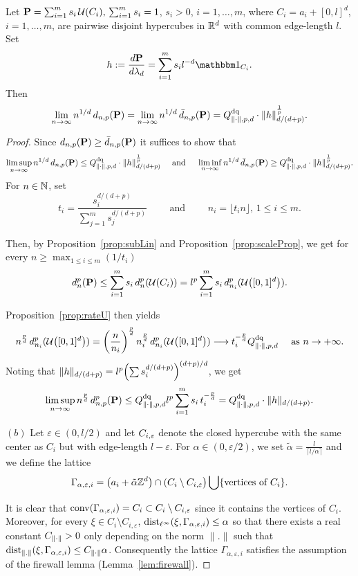 \begin{prop}\label{prop:rateCubewise}
Let $\mathbf{P} = \sum_{i=1}^m s_i\, \mathcal{U}(C_i),\, \sum_{i=1}^m s_i = 1$,  $s_i>0$, $i=1,\ldots,m$,
where $C_i=a_i+[0,l]^d$,  $i=1,\ldots,m$, are pairwise disjoint hypercubes in $\mathbb{R}^d$ with common edge-length
$l$. Set 
\[
h := \frac{d\Probb}{d\lambda_d}= \sum_{i=1}^m s_i
l^{-d}\ind{C_i}.
\]
Then
\[
 \lim_{n\to\infty} n^{1/d}\, d_{n,p}(\mathbf{P})=  \lim_{n\to\infty} n^{1/d}\, \bar d_{n,p}(\mathbf{P})= Q^{\text{dq}}_{\lVert\cdot\rVert, p, d}\cdot \lVert h\rVert_{d/(d+p)}^{\frac 1p} .
\]
\end{prop}
\begin{proof}Since $d_{n,p}(\mathbf{P})\ge \bar d_{n,p}(\mathbf{P})$ it suffices to show that 
\[
 \limsup_{n\to\infty} n^{1/d}\, d_{n,p}(\mathbf{P}) \leq Q^{\text{dq}}_{\lVert\cdot\rVert, p, d}\cdot \lVert h\rVert_{d/(d+p)}^{\frac 1p} \quad 
 \mbox{ and } \quad \liminf_{n\to\infty} n^{1/d}\, \bar d_{n,p}(\mathbf{P}) \geq Q^{\text{dq}}_{\lVert\cdot\rVert, p, d}\cdot \lVert h\rVert_{d/(d+p)}^{\frac 1p} .
\]
For $n\in\mathbb{N}$, set
\[
t_i = \frac{s_i^{d/(d+p)}}{\sum_{j=1}^m s_j^{d/(d+p)}} \qquad\text{ and }\qquad
n_i = \lfloor t_i n\rfloor, \,1\leq i \leq m.
\]

Then, by Proposition~\ref{prop:subLin} and Proposition~\ref{prop:scaleProp}, we
get for every $n\geq \max_{1\leq i \leq m}(1/t_i)$
\[
d_{n}^p(\mathbf{P}) \leq \sum_{i=1}^m s_i\, d_{n}^p(\mathcal{U}(C_i)) = l^p \sum_{i=1}^m s_i\,
d^p_{n_i}(\mathcal{U}\bigl([0,1]^d\bigr)).
\]

Proposition~\ref{prop:rateU} then yields
\[
n^{\frac pd}\, d^p_{n_i}(\mathcal{U}\bigl([0,1]^d\bigr)) = \biggl(\frac{n}{n_i}\biggr)^{\frac pd}\,
n_i^{\frac pd}\,d^p_{n_i}(\mathcal{U}\bigl([0,1]^d\bigr)) \longrightarrow  t_i^{-\frac pd} Q^{\text{dq}}_{\lVert\cdot\rVert, p, d} \quad\text{ as } n\to+\infty.
\]
Noting that  $\lVert h\rVert_{d/(d+p)} = l^p \Bigl( \sum s_i^{d/(d+p)} 
\Bigr)^{(d+p)/d}$,
we get
\[
\limsup_{n\to\infty} n^{\frac pd}\, d^p_{n,p}(\mathbf{P}) \leq Q^{\text{dq}}_{\lVert\cdot\rVert, p, d}  l^p \sum_{i=1}^m s_i\, t_i^{-\frac pd} = Q^{\text{dq}}_{\lVert\cdot\rVert, p, d}\cdot
\lVert h\rVert_{d/(d+p)}.
\]

\noindent $(b)$ Let $\varepsilon \in(0,l/2)$ and let $C_{i,\varepsilon}$ denote  the closed hypercube with
the same center as $C_i$ but with edge-length $l-\varepsilon$.
For $\alpha \in (0, \varepsilon/2)$, we set $\tilde \alpha = \frac{l}{\lceil l/\alpha\rceil }$ and we define the lattice 
$$
 \Gamma_{\alpha, \varepsilon,i} = \big(a_i+ \tilde \alpha\mathbb{Z}^d\big)\cap (C_i\setminus C_{i,\varepsilon}\big) \bigcup \{\mbox{vertices of }  C_i\}.
$$

 
It is clear that $\operatorname{conv}(\Gamma_{\alpha,\varepsilon,i}) = C_i \subset C_i\setminus C_{i,\varepsilon}$ since it contains the vertices of $C_i$.
Moreover, for every $\xi\!\in C_i\setminus C_{i,\varepsilon}$, ${\rm dist}_{\ell^{\infty}}(\xi,\Gamma_{\alpha,\varepsilon,i})\le \alpha$ so that there exists a real constant $C_{\lVert\cdot\rVert}>0$ only depending on the norm $\|.\|$ such that ${\rm dist}_{\|.\|}(\xi,\Gamma_{\alpha,\varepsilon,i})\le C_{\lVert\cdot\rVert} \alpha$. Consequently the lattice $\Gamma_{\alpha,\varepsilon,i}$ satisfies the assumption of the firewall lemma (Lemma~\ref{lem:firewall}).
 

\end{proof}
